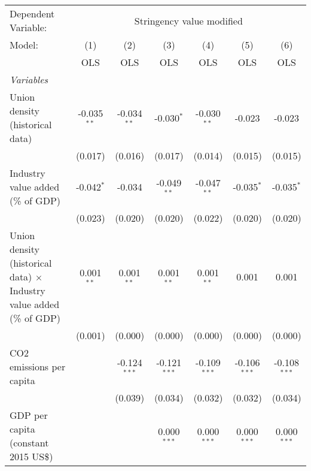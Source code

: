 
\begingroup
\centering
\begin{tabular}{lcccccc}
   \toprule
   Dependent Variable: & \multicolumn{6}{c}{Stringency value modified}\\
   Model:                                                                      & (1)           & (2)            & (3)            & (4)            & (5)            & (6)\\  
                                                                               &  OLS          & OLS            & OLS            & OLS            & OLS            & OLS\\  
   \midrule
   \emph{Variables}\\
   Union density (historical data)                                             & -0.035$^{**}$ & -0.034$^{**}$  & -0.030$^{*}$   & -0.030$^{**}$  & -0.023         & -0.023\\   
                                                                               & (0.017)       & (0.016)        & (0.017)        & (0.014)        & (0.015)        & (0.015)\\   
   Industry value added (\% of GDP)                                            & -0.042$^{*}$  & -0.034         & -0.049$^{**}$  & -0.047$^{**}$  & -0.035$^{*}$   & -0.035$^{*}$\\   
                                                                               & (0.023)       & (0.020)        & (0.020)        & (0.022)        & (0.020)        & (0.020)\\   
   Union density (historical data) $\times$ Industry value added (\% of GDP)   & 0.001$^{**}$  & 0.001$^{**}$   & 0.001$^{**}$   & 0.001$^{**}$   & 0.001          & 0.001\\   
                                                                               & (0.001)       & (0.000)        & (0.000)        & (0.000)        & (0.000)        & (0.000)\\   
   CO2 emissions per capita                                                    &               & -0.124$^{***}$ & -0.121$^{***}$ & -0.109$^{***}$ & -0.106$^{***}$ & -0.108$^{***}$\\   
                                                                               &               & (0.039)        & (0.034)        & (0.032)        & (0.032)        & (0.034)\\   
   GDP per capita (constant 2015 US\$)                                         &               &                & 0.000$^{***}$  & 0.000$^{***}$  & 0.000$^{***}$  & 0.000$^{***}$\\   

\end{tabular}
